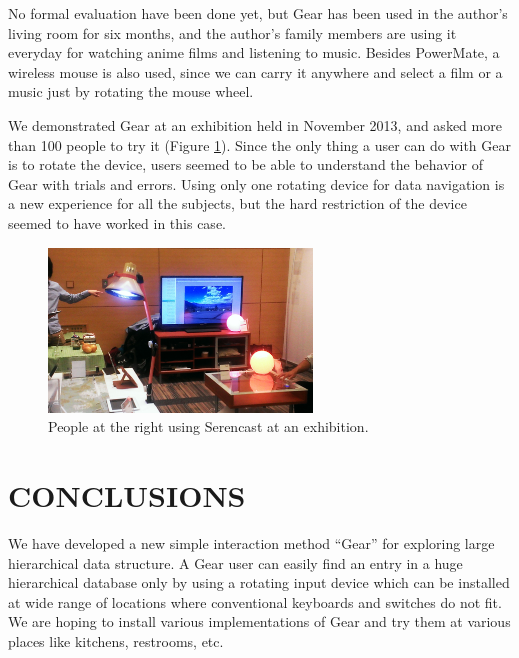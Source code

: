 \documentclass{article}
\def\SC{\textsf{\small Serencast}}
\begin{document}
No formal evaluation have been done yet, but Gear has been used in the author's
living room for six months, and the author's family members are using it
everyday for watching anime films and listening to music.
Besides PowerMate, a wireless mouse is also used,
since we can carry it anywhere and select
a film or a music just by rotating the mouse wheel.

We demonstrated Gear at an exhibition
held in November 2013, and asked more than 100 people to try it
(Figure \ref{exhibition}).
%
Since the only thing a user can do with Gear is to rotate the device,
users seemed to be able to understand the behavior of Gear with trials and errors.
% 
% 
Using only one rotating device for data navigation is a new experience for
all the subjects, but the hard restriction of the device seemed to have worked in this case.

\begin{figure}[H]
\centerline{\includegraphics[width=70mm,bb=0 0 527 329]{figures/c520d5dfbd06c532d48d324a7019b00c.png}}
\caption{People at the right using {\SC} at an exhibition.}
\label{exhibition}
\end{figure}


\section*{CONCLUSIONS}

We have developed a new simple interaction method ``Gear'' for exploring
large hierarchical data structure.
A Gear user can easily find an entry in a huge hierarchical database
only by using a rotating input device which can be installed at
wide range of locations where conventional keyboards and switches do not fit.
We are hoping to install various implementations of Gear and try them at
various places like kitchens, restrooms, etc.

\small{


}
\end{document}
